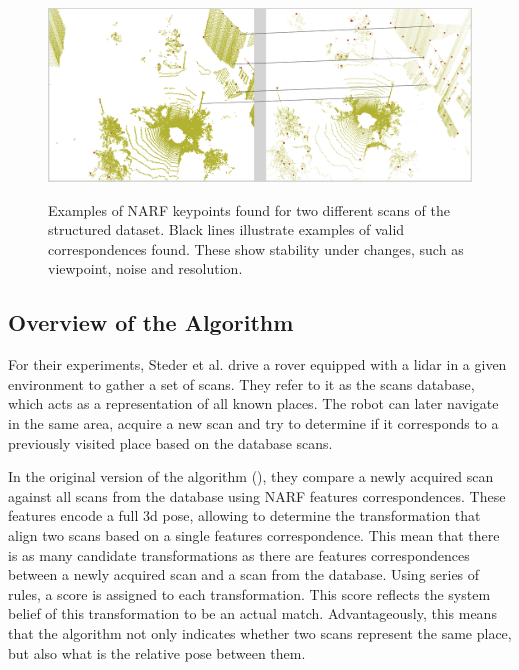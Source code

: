\begin{figure}[H]
    \centering
    \includegraphics[width=0.995\linewidth]{img/chap_slam/features_line.png}\\
    \caption{Examples of NARF keypoints found for two different scans of the structured dataset. Black lines illustrate examples of valid correspondences found. These show stability under changes, such as viewpoint, noise and resolution.}
    \label{fig:chap_slam_features_correspondences}
\end{figure}


\subsection{Overview of the Algorithm}
\label{ssec:chap_slam_algo}

For their experiments, Steder et al. drive a rover equipped with a \gls*{lidar} in a given environment to gather a set of scans. They refer to it as the scans database, which acts as a representation of all known places. The robot can later navigate in the same area, acquire a new scan and try to determine if it corresponds to a previously visited place based on the database scans. 

In the original version of the algorithm (\cite{Steder2010}), they compare a newly acquired scan against all scans from the database using NARF features correspondences. These features encode a full \gls*{3d} pose, allowing to determine the transformation that align two scans based on a single features correspondence. This mean that there is as many candidate transformations as there are features correspondences between a newly acquired scan and a scan from the database. Using series of rules, a score is assigned to each transformation. This score reflects the system belief of this transformation to be an actual match. Advantageously, this means that the algorithm not only indicates whether two scans represent the same place, but also what is the relative pose between them.

